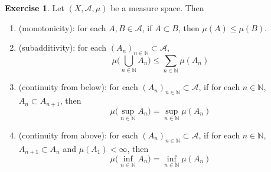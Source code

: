 \documentclass[12pt]{amsart}
\theoremstyle{definition}
\newtheorem{ex}[definition]{Exercise}
\newcommand{\N}{\mathbb{N}}
\newcommand{\MA}{\mathcal{A}}
\newcommand{\lex}[1]{\label{ex:#1}}
\begin{document}
	\begin{ex} \lex{00000} 
		Let $(X, \MA, \mu)$ be a measure space. Then 
		\begin{enumerate}
			\item (monotonicity): for each $A,B \in \MA$, if $A \subset B$, then $\mu(A) \leq \mu(B)$.
			\item (subadditivity): for each $(A_n)_{n \in \N} \subset \MA$, $$\mu \bigg( \bigcup_{n \in \N} A_n \bigg) \leq \sum_{n \in \N}\mu(A_n)$$
			\item (continuity from below): for each $(A_n)_{n \in \N} \subset \MA$, if for each $n \in \N$, $A_n \subset A_{n+1}$, then $$\mu\bigg(\sup_{n \in \N} A_n\bigg) = \sup_{n \in \N}\mu(A_n)$$
			\item (continuity from above): for each $(A_n)_{n \in \N} \subset \MA$, if for each $n \in \N$, $ A_{n+1} \subset A_n$ and $\mu(A_1) < \infty$, then $$\mu\bigg(\inf_{n \in \N} A_n\bigg) = \inf_{n \in \N}\mu(A_n)$$
		\end{enumerate}
		
	\end{ex}
	
\end{document}
